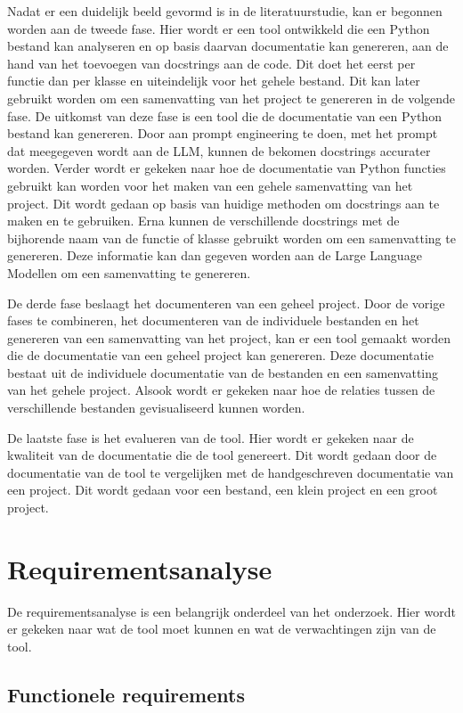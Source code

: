 Nadat er een duidelijk beeld gevormd is in de literatuurstudie, kan er begonnen worden aan de tweede fase.
Hier wordt er een tool ontwikkeld die een Python bestand kan analyseren en op basis daarvan documentatie kan genereren, aan de hand van het toevoegen van docstrings aan de code.
Dit doet het eerst per functie dan per klasse en uiteindelijk voor het gehele bestand. Dit kan later gebruikt worden om een samenvatting van het project te genereren in de volgende fase.
De uitkomst van deze fase is een tool die de documentatie van een Python bestand kan genereren. 
Door aan prompt engineering te doen, met het prompt dat meegegeven wordt aan de LLM, kunnen de bekomen docstrings accurater worden.
Verder wordt er gekeken naar hoe de documentatie van Python functies gebruikt kan worden voor het maken van een gehele samenvatting van het project.
Dit wordt gedaan op basis van huidige methoden om docstrings aan te maken en te gebruiken. 
Erna kunnen de verschillende docstrings met de bijhorende naam van de functie of klasse gebruikt worden om een samenvatting te genereren.
Deze informatie kan dan gegeven worden aan de Large Language Modellen om een samenvatting te genereren.

De derde fase beslaagt het documenteren van een geheel project.
Door de vorige fases te combineren, het documenteren van de individuele bestanden en het genereren van een samenvatting van het project, kan er een tool gemaakt worden die de documentatie van een geheel project kan genereren.
Deze documentatie bestaat uit de individuele documentatie van de bestanden en een samenvatting van het gehele project. 
Alsook wordt er gekeken naar hoe de relaties tussen de verschillende bestanden gevisualiseerd kunnen worden.

De laatste fase is het evalueren van de tool.
Hier wordt er gekeken naar de kwaliteit van de documentatie die de tool genereert.
Dit wordt gedaan door de documentatie van de tool te vergelijken met de handgeschreven documentatie van een project.
Dit wordt gedaan voor een bestand, een klein project en een groot project.

\section{Requirementsanalyse}
\label{sec:requirements-analyse}
De requirementsanalyse is een belangrijk onderdeel van het onderzoek. 
Hier wordt er gekeken naar wat de tool moet kunnen en wat de verwachtingen zijn van de tool.

\subsection{Functionele requirements}
\label{sec:functionele-requirements}
